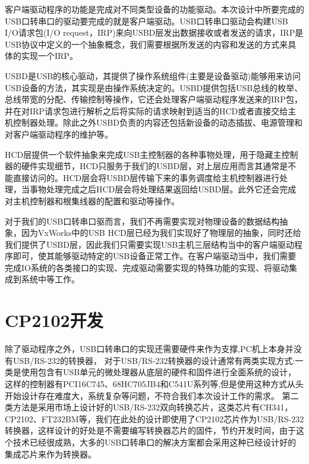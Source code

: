 	客户端驱动程序的功能是完成对不同类型设备的功能驱动。本次设计中所要完成的USB口转串口的驱动要完成的就是客户端驱动。USB口转串口驱动会构建USB I/O请求包(I/O request，IRP)来向USBD层发出数据接收或者发送的请求，IRP是USB协议中定义的一个抽象概念，我们需要根据所发送的内容和发送的方式来具体的实现一个IRP\cite{李雪红2004USB}。
	
	USBD是USB的核心驱动，其提供了操作系统组件(主要是设备驱动)能够用来访问USB设备的方法，其实现是由操作系统决定的。USBD提供包括USB总线的枚举、总线带宽的分配、传输控制等操作，它还会处理客户端驱动程序发送来的IRP包，并在对IRP请求包进行解析之后将实际的请求映射到适当的HCD或者直接交给主机控制器处理。除此之外USBD负责的内容还包括新设备的动态插拔、电源管理和对客户端驱动程序的维护等。
	
	HCD层提供一个软件抽象来完成USB主控制器的各种事物处理，用于隐藏主控制器的硬件实现细节，HCD只服务于我们的USBD层，对上层应用而言其通常是不能直接访问的。HCD层会将USBD层传输下来的事务调度给主机控制器进行处理，当事物处理完成之后HCD层会将处理结果返回给USBD层。此外它还会完成对主机控制器和根集线器的配置和驱动等操作\cite{李雪红2004USB}。
	
	对于我们的USB口转串口驱而言，我们不再需要实现对物理设备的数据结构抽象，因为VxWorks中的USB HCD层已经为我们实现好了物理层的抽象，同时还给我们提供了USBD层，因此我们只需要实现USB主机三层结构当中的客户端驱动程序即可，使其能够驱动特定的USB设备正常工作。在客户端驱动当中，我们需要完成IO系统的各类接口的实现、完成驱动需要实现的特殊功能的实现、将驱动集成到系统中等工作。
	


\section{CP2102开发}
	除了驱动程序之外，USB口转串口的实现还需要硬件来作为支撑,PC机上本身并没有USB/RS-232的转换器，
	对于USB/RS-232转换器的设计通常有两类实现方式:一类是使用包含有USB单元的微处理器从底层的硬件和固件进行全面系统的设计，这样的控制器有PCI16C745、68HC705JB4和C541U系列等\cite{USB与RS232接口转换器的设计},但是使用这种方式从头开始设计存在难度大，系统复杂等问题，不符合我们本次设计工作的需求。
	第二类方法是采用市场上设计好的USB/RS-232双向转换芯片，这类芯片有CH341，CP2102、FT232BM等，我们在此处的设计即使用了CP2102芯片作为USB/RS-232转换器，这样设计的好处是不需要编写转换器芯片的固件，节约开发时间，由于这个技术已经很成熟，大多的USB口转串口的解决方案都会采用这种已经设计好的集成芯片来作为转换器。
	
